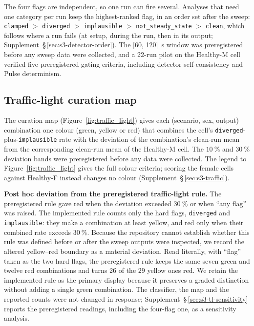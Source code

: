 \documentclass[pdflatex,sn-nature]{sn-jnl}%
\begin{document}
The four flags are independent, so one run can fire several. Analyses that need one category per run keep the highest-ranked flag, in an order set after the sweep: \texttt{clamped} $>$ \texttt{diverged} $>$ \texttt{implausible} $>$ \texttt{not\_steady\_state} $>$ \texttt{clean}, which follows where a run fails (at setup, during the run, then in its output; Supplement~\S\,\ref{sec:s3-detector-order}). The [60, 120]~s window was preregistered before any sweep data were collected, and a 22-run pilot on the Healthy-M cell verified five preregistered gating criteria, including detector self-consistency and Pulse determinism.

\subsection{Traffic-light curation map}\label{sec:methods-traffic}

The curation map (Figure~\ref{fig:traffic_light}) gives each (scenario, sex, output) combination one colour (green, yellow or red) that combines the cell's \texttt{diverged}-plus-\texttt{implausible} rate with the deviation of the combination's clean-run mean from the corresponding clean-run mean of the Healthy-M cell. The $10~\%$ and $30~\%$ deviation bands were preregistered before any data were collected. The legend to Figure~\ref{fig:traffic_light} gives the full colour criteria; scoring the female cells against Healthy-F instead changes no colour (Supplement~\S\,\ref{sec:s3-traffic}).

\textbf{Post hoc deviation from the preregistered traffic-light rule.} The preregistered rule gave red when the deviation exceeded $30~\%$ or when ``any flag'' was raised. The implemented rule counts only the hard flags, \texttt{diverged} and \texttt{implausible}: they make a combination at least yellow, and red only when their combined rate exceeds $30~\%$. Because the repository cannot establish whether this rule was defined before or after the sweep outputs were inspected, we record the altered yellow--red boundary as a material deviation. Read literally, with ``flag'' taken as the two hard flags, the preregistered rule keeps the same seven green and twelve red combinations and turns 26 of the 29 yellow ones red. We retain the implemented rule as the primary display because it preserves a graded distinction without adding a single green combination. The classifier, the map and the reported counts were not changed in response; Supplement~\S\,\ref{sec:s3-tl-sensitivity} reports the preregistered readings, including the four-flag one, as a sensitivity analysis.
\end{document}
